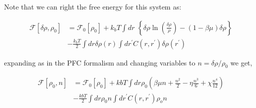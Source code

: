 \documentclass[11pt]{article}
\begin{document}
Note that we can right the free energy for this system as:

\begin{align}
\mathcal{F}[\delta \rho, \rho_0] &= \mathcal{F}_0[\rho_0] + k_bT \int dr \,\,\left\lbrace \delta \rho \ln\left(\frac{\delta\rho}{\rho}\right) - (1 - \beta \mu)\delta\rho\right\rbrace \\ 
&- \frac{k_bT}{2}\int dr \delta \rho(r) \int dr^\prime C(r, r^\prime) \delta \rho(r^\prime)
\end{align}

expanding as in the PFC formalism and changing variables to $n = \delta \rho/\rho_0$ we get, 

\begin{align}
\mathcal{F}[\rho_0, n] &= \mathcal{F}_0[\rho_0] + kbT\int dr \rho_0 \left(\beta \mu n + \frac{n^2}{2} - \eta\frac{n^3}{6} + \chi \frac{n^4}{12}\right)\\
 &-\frac{kbT}{2}\int dr \rho_0 n \int dr^\prime C(r, r^\prime) \rho_o n
\end{align}
\end{document}
